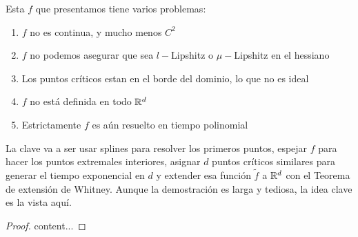 \begin{remark}
	Esta $f$ que presentamos tiene varios problemas:
	
	\begin{enumerate}
		\item $f$ no es continua, y mucho menos $C^2$
		\item $f$ no podemos asegurar que sea $l-$Lipshitz o $\mu-$Lipshitz en el hessiano
		\item Los puntos cr\'iticos estan en el borde del dominio, lo que no es ideal
		\item $f$ no est\'a definida en todo ${\mathbb{R}}^d$
		\item Estrictamente $f$ es a\'un resuelto en tiempo polinomial
	\end{enumerate}
	
	La clave va a ser usar splines para resolver los primeros puntos, espejar $f$ para hacer los puntos extremales interiores, asignar $d$ puntos cr\'iticos similares para generar el tiempo exponencial en $d$ y extender esa funci\'on $\tilde{f}$ a ${\mathbb{R}}^d$ con el Teorema de extensi\'on de Whitney. Aunque la demostraci\'on es larga y tediosa, la idea clave es la vista aqu\'i.
\end{remark}

\begin{proof}
	content...
\end{proof}